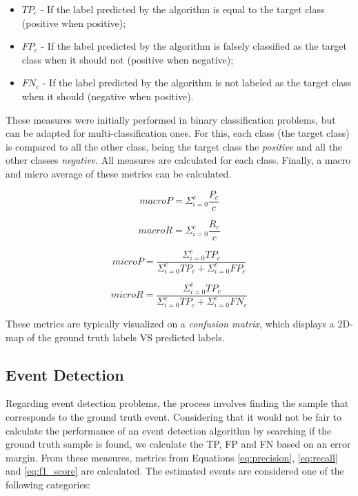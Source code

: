 \begin{itemize}
    \item $TP_c$ - If the label predicted by the algorithm is equal to the target class (positive when positive);
    
    \item $FP_c$ - If the label predicted by the algorithm is falsely classified as the target class when it should not (positive when negative);
    
    \item $FN_c$ - If the label predicted by the algorithm is not labeled as the target class when it should (negative when positive).
    
\end{itemize}

These measures were initially performed in binary classification problems, but can be adapted for multi-classification ones. For this, each class (the target class) is compared to all the other class, being the target class the \textit{positive} and all the other classes \textit{negative}. All measures are calculated for each class. Finally, a macro and micro average of these metrics can be calculated.

\begin{equation}
macroP = \Sigma_{i=0}^c \frac{P_c}{c}
\end{equation}

\begin{equation}
macroR = \Sigma_{i=0}^c \frac{R_c}{c}
\end{equation}

\begin{equation}
microP = \frac{\Sigma_{i=0}^c TP_c}{\Sigma_{i=0}^c TP_c + \Sigma_{i=0}^c FP_c}
\end{equation}

\begin{equation}
microR = \frac{\Sigma_{i=0}^c TP_c}{\Sigma_{i=0}^c TP_c + \Sigma_{i=0}^c FN_c}
\end{equation}

These metrics are typically visualized on a \textit{confusion matrix}, which displays a 2D-map of the ground truth labels VS predicted labels.

\subsection{Event Detection}

Regarding event detection problems, the process involves finding the sample that corresponds to the ground truth event. Considering that it would not be fair to calculate the performance of an event detection algorithm by searching if the ground truth sample is found, we calculate the TP, FP and FN based on an error margin. From these measures, metrics from Equations \ref{eq:precision}, \ref{eq:recall} and \ref{eq:f1_score} are calculated. The estimated events are considered one of the following categories:


